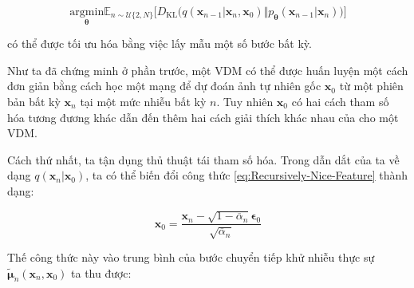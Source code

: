\documentclass[14pt, a4paper]{article}
\numberwithin{equation}{section}
\numberwithin{figure}{section}
\numberwithin{dl}{section}
\numberwithin{md}{section}
\numberwithin{bd}{section}
\numberwithin{dn}{section}
\numberwithin{hq}{section}
\begin{document}
    \begin{equation}
        \underset{\boldsymbol{\theta}}{\mathrm{argmin}} \mathbb{E}_{n \sim \mathcal{U}\lbrace 2, N \rbrace} \Big \lbrack D_{\mathrm{KL}} \Big( q(\boldsymbol{x}_{n-1} \vert \boldsymbol{x}_n, \boldsymbol{x}_0) \Vert p_{\boldsymbol{\theta}} (\boldsymbol{x}_{n-1} \vert \boldsymbol{x}_n) \Big) \Big \rbrack
    \end{equation}
    
    có thể được tối ưu hóa bằng việc lấy mẫu một số bước bất kỳ.

    Như ta đã chứng minh ở phần trước, một VDM có thể được huấn luyện một cách đơn giản bằng cách học một mạng để dự đoán ảnh tự nhiên gốc $\boldsymbol{x}_0$ từ một phiên bản bất kỳ $\boldsymbol{x}_n$ tại một mức nhiễu bất kỳ $n$.
    Tuy nhiên $\boldsymbol{x}_0$ có hai cách tham số hóa tương đương khác dẫn đến thêm hai cách giải thích khác nhau của cho một VDM.

    Cách thứ nhất, ta tận dụng thủ thuật tái tham số hóa.
    Trong dẫn dắt của ta về dạng $q(\boldsymbol{x}_n \vert \boldsymbol{x}_0)$, ta có thể biến đổi công thức \ref{eq:Recursively-Nice-Feature} thành dạng:

    \begin{equation}
        \boldsymbol{x}_0 = \dfrac{\boldsymbol{x}_n - \sqrt{1 - \overline{\alpha}_n} \boldsymbol{\epsilon}_0}{\sqrt{\overline{\alpha}_n}}
    \end{equation}

    Thế công thức này vào trung bình của bước chuyển tiếp khử nhiễu thực sự $\tilde{\boldsymbol{\mu}}_n (\boldsymbol{x}_n, \boldsymbol{x}_0)$ ta thu được:
    
\end{document}
